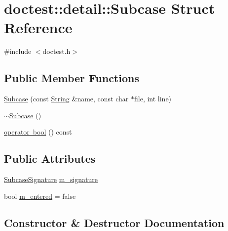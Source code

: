 \hypertarget{structdoctest_1_1detail_1_1_subcase}{}\section{doctest\+:\+:detail\+:\+:Subcase Struct Reference}
\label{structdoctest_1_1detail_1_1_subcase}


{\ttfamily \#include $<$doctest.\+h$>$}

\subsection*{Public Member Functions}
\begin{DoxyCompactItemize}
\item 
\mbox{\hyperlink{structdoctest_1_1detail_1_1_subcase_a8f7d4a5ddfb8ae48663e5cfc786e6f12}{Subcase}} (const \mbox{\hyperlink{classdoctest_1_1_string}{String}} \&name, const char $\ast$file, int line)
\item 
\mbox{\hyperlink{structdoctest_1_1detail_1_1_subcase_a4812988371d226236be53c302c86abe2}{$\sim$\+Subcase}} ()
\item 
\mbox{\hyperlink{structdoctest_1_1detail_1_1_subcase_a91a520769fc55fb5be781f949ef3200f}{operator bool}} () const
\end{DoxyCompactItemize}
\subsection*{Public Attributes}
\begin{DoxyCompactItemize}
\item 
\mbox{\hyperlink{structdoctest_1_1_subcase_signature}{Subcase\+Signature}} \mbox{\hyperlink{structdoctest_1_1detail_1_1_subcase_a54730e9b88cf33ea4a5c873164029202}{m\+\_\+signature}}
\item 
bool \mbox{\hyperlink{structdoctest_1_1detail_1_1_subcase_acb703ee6e769f56fba4053447c1a36e4}{m\+\_\+entered}} = false
\end{DoxyCompactItemize}


\subsection{Constructor \& Destructor Documentation}
\mbox{\label{structdoctest_1_1detail_1_1_subcase_a8f7d4a5ddfb8ae48663e5cfc786e6f12}} 
